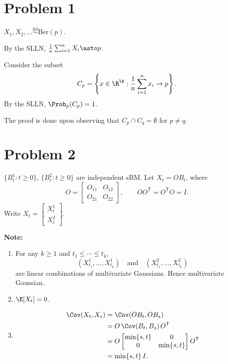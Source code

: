 
\section*{Problem 1}

$X_1, X_2, \ldots \overset{\text{iid}}{\sim} \mathrm{Ber}(p)$.

By the SLLN, $\frac{1}{n} \sum_{i=1}^{n} X_i \asto p$.

Consider the subset
\[
    C_p = \left\{ x \in \R^\N : \frac{1}{n} \sum_{i=1}^{n} x_i \to p \right\}.
\]
By the SLLN, $\Prob_p(C_p) = 1$.

The proof is done upon observing that $C_p \cap C_q = \emptyset$ for $p \neq q$.

\section*{Problem 2}

$\{B_t^1 : t \geq 0\}$, $\{B_t^2 : t \geq 0\}$ are independent sBM. Let $X_t = O B_t$, where
\[
    O = \begin{bmatrix} O_{11} & O_{12} \\ O_{21} & O_{22} \end{bmatrix}, \qquad O O^\mathsf{T} = O^\mathsf{T} O = I.
\]
Write $X_t = \begin{bmatrix} X_t^1 \\ X_t^2 \end{bmatrix}$.

\textbf{Note:}
\begin{enumerate}[label=(\roman*)]
    \item For any $k \geq 1$ and $t_1 \leq \cdots \leq t_k$,
    \[
        (X_{t_1}^1, \ldots, X_{t_k}^1) \quad \text{and} \quad (X_{t_1}^2, \ldots, X_{t_k}^2)
    \]
    are linear combinations of multivariate Gaussians. Hence multivariate Gaussian.

    \item $\E[X_t] = 0$.

    \item
    \begin{align*}
        \Cov(X_t, X_s) &= \Cov(O B_t, O B_s) \\
        &= O \, \Cov(B_t, B_s) \, O^\mathsf{T} \\
        &= O \begin{bmatrix} \min\{s,t\} & 0 \\ 0 & \min\{s,t\} \end{bmatrix} O^\mathsf{T} \\
        &= \min\{s,t\} \, I.
    \end{align*}
\end{enumerate}

